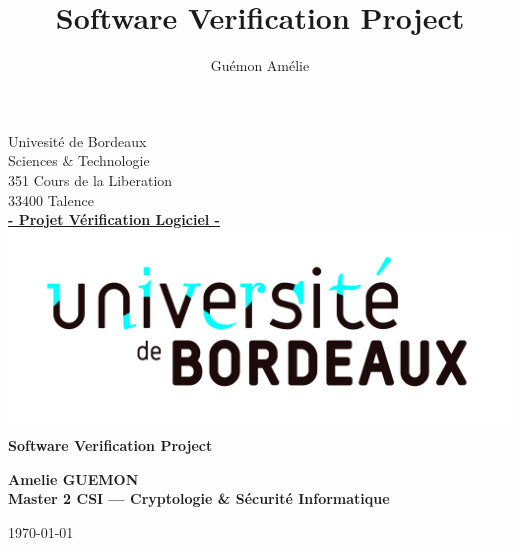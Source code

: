 \documentclass[a4paper]{article}
\title{Software Verification Project}
\author{Guémon Amélie}
\begin{document}
\begin{titlepage}
  \begin{sffamily}
    \begin{center}

      Univesité de Bordeaux\\ Sciences \& Technologie\\
      351 Cours de la Liberation\\33400 Talence\\[1em]
      \textbf{\underline{- Projet Vérification Logiciel -}}\\[1.5cm]
      
      \includegraphics[scale=0.11]{UB.jpg}
      \\[3cm]
      
      { \huge \bfseries Software Verification Project\\[0.5cm] }
      \begin{flushright}
        \bfseries {Amelie GUEMON \\[1em]Master 2 CSI --- Cryptologie \& Sécurité Informatique}\\[6.6cm]
      \end{flushright}
      
      
      \today

    \end{center}
  \end{sffamily}
\end{titlepage}






\end{document}
